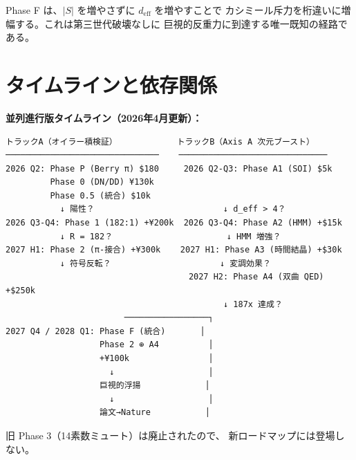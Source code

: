 \documentclass[11pt,a4paper]{article}
\begin{document}
Phase F は、$|S|$ を増やさずに $d_{\mathrm{eff}}$ を増やすことで
カシミール斥力を桁違いに増幅する。これは第三世代破壊なしに
巨視的反重力に到達する唯一既知の経路である。


\section{タイムラインと依存関係}

\textbf{並列進行版タイムライン（2026年4月更新）：}

\begin{verbatim}
トラックA（オイラー積検証）            トラックB（Axis A 次元ブースト）
───────────────────────────────    ──────────────────────────────
2026 Q2: Phase P (Berry π) $180     2026 Q2-Q3: Phase A1 (SOI) $5k
         Phase 0 (DN/DD) ¥130k
         Phase 0.5 (統合) $10k
           ↓ 陽性？                          ↓ d_eff > 4？
2026 Q3-Q4: Phase 1 (182:1) +¥200k  2026 Q3-Q4: Phase A2 (HMM) +$15k
           ↓ R = 182？                       ↓ HMM 増強？
2027 H1: Phase 2 (π-接合) +¥300k    2027 H1: Phase A3 (時間結晶) +$30k
           ↓ 符号反転？                      ↓ 変調効果？
                                     2027 H2: Phase A4 (双曲 QED) +$250k
                                            ↓ 187x 達成？
                        ─────────────────┐
2027 Q4 / 2028 Q1: Phase F (統合)       │
                   Phase 2 ⊕ A4          │
                   +¥100k                │
                     ↓                   │
                   巨視的浮揚             │
                     ↓                   │
                   論文→Nature           │
\end{verbatim}

旧 Phase 3（14素数ミュート）は廃止されたので、
新ロードマップには登場しない。
\end{document}
